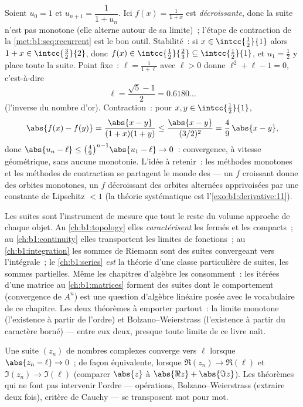 \begin{example}\label{ex:b1:seq:golden}
Soient $u_0 = 1$ et $u_{n+1} = \dfrac{1}{1 + u_n}$. Ici $f(x) =
\frac{1}{1+x}$ est \emph{décroissante}, donc la suite n'est pas
monotone (elle alterne autour de sa limite)~; l'étape de contraction
de la \cref{met:b1:seq:recurrent} est le bon outil. Stabilité~: si
$x \in \intcc{\frac12}{1}$ alors $1 + x \in
\intcc{\frac32}{2}$, donc $f(x) \in \intcc{\frac12}{\frac23}
\subseteq \intcc{\frac12}{1}$, et $u_1 = \frac12$ y place toute la
suite. Point fixe~: $\ell = \frac{1}{1+\ell}$ avec $\ell > 0$ donne
$\ell^2 + \ell - 1 = 0$, c'est-à-dire
\[
\ell = \frac{\sqrt5 - 1}{2} = 0.6180\dots
\]
(l'inverse du nombre d'or). Contraction~: pour $x, y \in
\intcc{\frac12}{1}$,
\[
\abs{f(x) - f(y)} = \frac{\abs{x - y}}{(1+x)(1+y)}
\leq \frac{\abs{x-y}}{(3/2)^2} = \frac49\,\abs{x - y} ,
\]
donc $\abs{u_n - \ell} \leq \bigl(\frac49\bigr)^{n-1}\abs{u_1 -
\ell} \to 0$~: convergence, à vitesse géométrique, sans aucune
monotonie. L'idée à retenir~: les méthodes monotones et les méthodes
de contraction se partagent le monde des  --- un $f$
croissant donne des orbites monotones, un $f$ décroissant des orbites
alternées apprivoisées par une constante de Lipschitz $< 1$ (la
théorie systématique est l'\cref{exo:b1:derivative:11}).
\end{example}

\begin{remark}
Les suites sont l'instrument de mesure que tout le reste du volume
approche de chaque objet. Au \cref{ch:b1:topology} elles
\emph{caractérisent} les fermés et les compacts~; au
\cref{ch:b1:continuity} elles transportent les limites de fonctions~;
au \cref{ch:b1:integration} les sommes de Riemann sont des suites
convergeant vers l'intégrale~; le \cref{ch:b1:series} \emph{est} la
théorie d'une classe particulière de suites, les sommes partielles.
Même les chapitres d'algèbre les consomment~: les itérées d'une
matrice au \cref{ch:b1:matrices} forment des suites dont le
comportement (convergence de $A^n$) est une question d'algèbre
linéaire posée avec le vocabulaire de ce chapitre. Les deux théorèmes
à emporter partout~: la limite monotone (l'existence à partir de
l'ordre) et Bolzano--Weierstrass (l'existence à partir du caractère
borné) --- entre eux deux, presque toute limite de ce livre naît.
\end{remark}

\begin{remark}
Une suite $(z_n)$ de nombres complexes converge vers $\ell$ lorsque
$\abs{z_n - \ell} \to 0$~; de façon équivalente, lorsque $\Re(z_n) \to
\Re(\ell)$ et $\Im(z_n) \to \Im(\ell)$ (comparer $\abs{z}$ à
$\abs{\Re z} + \abs{\Im z}$). Les théorèmes qui ne font pas intervenir
l'ordre --- opérations, Bolzano--Weierstrass (extraire deux fois),
critère de Cauchy --- se transposent mot pour mot.
\end{remark}

